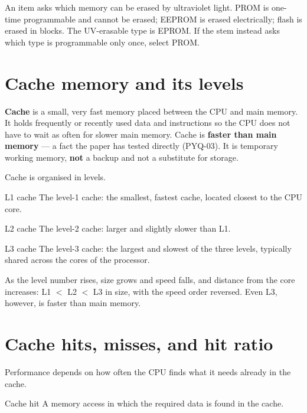 \begin{example}
An item asks which memory can be erased by ultraviolet light. PROM is
one-time programmable and cannot be erased; EEPROM is erased electrically;
flash is erased in blocks. The UV-erasable type is EPROM. If the stem
instead asks which type is programmable only once, select PROM.
\end{example}

\section{Cache memory and its levels}
\textbf{Cache} is a small, very fast memory placed between the CPU and main
memory. It holds frequently or recently used data and instructions so the
CPU does not have to wait as often for slower main memory. Cache is
\textbf{faster than main memory} --- a fact the paper has tested directly
(PYQ-03). It is temporary working memory, \textbf{not} a backup and not a
substitute for storage.

Cache is organised in levels.

\begin{definitionbox}{L1 cache}
The level-1 cache: the smallest, fastest cache, located closest to the CPU
core.
\end{definitionbox}

\begin{definitionbox}{L2 cache}
The level-2 cache: larger and slightly slower than L1.
\end{definitionbox}

\begin{definitionbox}{L3 cache}
The level-3 cache: the largest and slowest of the three levels, typically
shared across the cores of the processor.
\end{definitionbox}

As the level number rises, size grows and speed falls, and distance from the
core increases: L1 $<$ L2 $<$ L3 in size, with the speed order reversed.
Even L3, however, is faster than main memory.

\section{Cache hits, misses, and hit ratio}
Performance depends on how often the CPU finds what it needs already in the
cache.

\begin{definitionbox}{Cache hit}
A memory access in which the required data is found in the cache.
\end{definitionbox}

